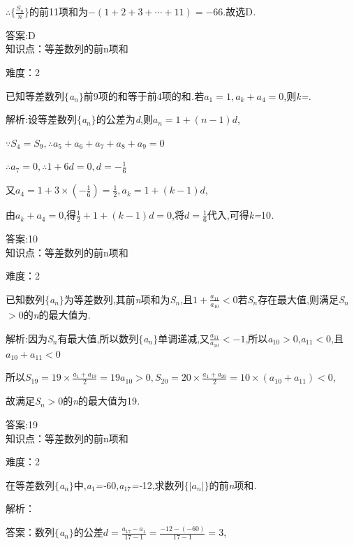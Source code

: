 \documentclass{article} %
\begin{document}
$\therefore \{\frac{S_n}{n}\}$的前11项和为$-(1+2+3+\cdots +11)=-66$.故选D\textit{.}

 答案:D \\

知识点：等差数列的前n项和

难度：2

 已知等差数列$\mathrm{\{}$\textit{a${}_{n}$}$\mathrm{\}}$前9项的和等于前4项的和\textit{.}若$a_1=1,a_k+a_4=0$,则\textit{k=\underbar{　　　　　}.~}

 解析:设等差数列$\mathrm{\{}$\textit{a${}_{n}$}$\mathrm{\}}$的公差为\textit{d},则$a_n=1+(n-1)d$,

$\because S_4=S_9, \therefore a_5+a_6+a_7+a_8+a_9=0$

$\therefore a_7=0, \therefore 1+6d=0,d=-\frac{1}{6}$

又$a_4=1+3\times (-\frac{1}{6})=\frac{1}{2},a_k=1+(k-1)d$,

由$a_k+a_4=0$,得$\frac{1}{2}+1+(k-1)d=0$,将$d=\frac{1}{6}$代入,可得\textit{k=}10\textit{.}

 答案:10 \\

知识点：等差数列的前n项和

难度：2

 已知数列$\mathrm{\{}$\textit{a${}_{n}$}$\mathrm{\}}$为等差数列,其前\textit{n}项和为\textit{S${}_{n}$},且$1+\frac{a_{11}}{a_{10}}<0$若\textit{S${}_{n}$}存在最大值,则满足\textit{S${}_{n}$$>$}0的\textit{n}的最大值为\textit{\underbar{　　　　　}.~}

 解析:因为\textit{S${}_{n}$}有最大值,所以数列$\mathrm{\{}$\textit{a${}_{n}$}$\mathrm{\}}$单调递减,又$\frac{a_{11}}{a_{10}}<-1$,所以\textit{a}${}_{10}$\textit{$>$}0,\textit{a}${}_{11}$\textit{$<$}0,且$a_{10}+a_{11}<0$

所以$S_{19}=19\times \frac{a_1+a_{19}}{2}=19a_{10}>0,S_{20}=20\times \frac{a_1+a_{20}}{2}=10\times(a_{10}+a_{11})<0$,

故满足\textit{S${}_{n}$$>$}0的\textit{n}的最大值为19\textit{.}

 答案:19 \\

知识点：等差数列的前n项和

难度：2

 在等差数列$\mathrm{\{}$\textit{a${}_{n}$}$\mathrm{\}}$中,\textit{a}${}_{1}$\textit{=-}60,\textit{a}${}_{17}$\textit{=-}12,求数列$\{|a_n|\}$的前\textit{n}项和\textit{.}

解析：

  答案：数列$\mathrm{\{}$\textit{a${}_{n}$}$\mathrm{\}}$的公差$d=\frac{a_{17}-a_1}{17-1}=\frac{-12-(-60)}{17-1}=3$,
\end{document}
